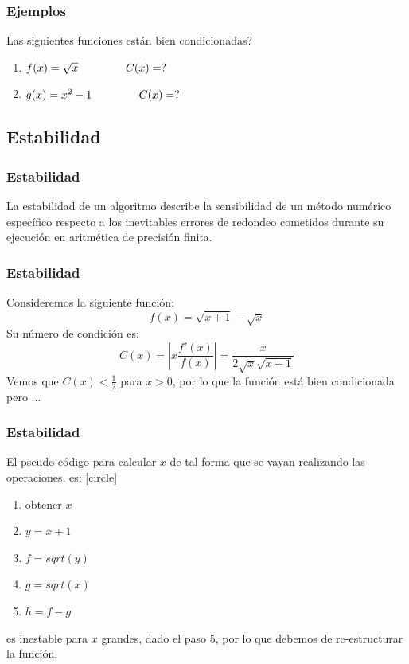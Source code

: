 \begin{frame}
\frametitle{Ejemplos}
 Las siguientes funciones están bien condicionadas?
\begin{enumerate}
\item $f(x) = \sqrt{x} \hspace{1.5cm} C(x) = ?$
\item $g(x) = x^{2}-1 \hspace{1.5cm} C(x) = ?$
\end{enumerate}
\end{frame}
\subsection{Estabilidad}
\begin{frame}
\frametitle{Estabilidad}
La estabilidad de un algoritmo describe la sensibilidad de un método numérico específico
respecto a los inevitables errores de redondeo cometidos durante su ejecución en aritmética de precisión finita.
\end{frame}
\begin{frame}
\frametitle{Estabilidad}
Consideremos la siguiente función:
\[ f(x) = \sqrt{x+1} - \sqrt{x} \]
Su número de condición es:
\[ C(x) = \left | x \dfrac{f'(x)}{f(x)} \right | = \dfrac{x}{2 \sqrt{x} \sqrt{x+1}}\]
Vemos que $C(x)< \frac{1}{2}$ para $x>0$, por lo que la función está bien condicionada pero ...
\end{frame}
\begin{frame}
\frametitle{Estabilidad}
El pseudo-código para calcular $x$ de tal forma que se vayan realizando las operaciones, es:
[circle]
\begin{enumerate}[<+->]
\item obtener $x$
\item $y = x + 1$
\item $f = sqrt(y)$
\item $g = sqrt(x)$
\item $h = f-g$
\end{enumerate}
\pause
es inestable para $x$ grandes, dado el paso 5, por lo que debemos de re-estructurar la función.
\end{frame}
